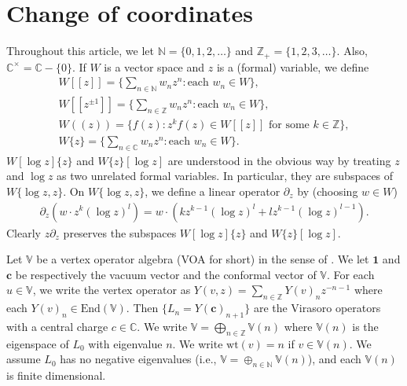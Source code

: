 \documentclass[12pt,a4paper,notitlepage]{article}
\theoremstyle{definition}
\theoremstyle{plain}
\newcommand{\End}{\mathrm{End}} %
\newcommand{\id}{\mathbf{1}}
\newcommand{\mbb}{\mathbb}
\newcommand{\Vbb}{\mathbb V}
\newcommand{\Cbb}{\mathbb C}
\newcommand{\Nbb}{\mathbb N}
\newcommand{\Zbb}{\mathbb Z}
\newcommand{\cbf}{\mathbf c}
\newcommand{\wt}{\mathrm{wt}}
\numberwithin{equation}{section}
\begin{document}
\section{Change of coordinates}\label{lb58}

Throughout this article, we let $\Nbb=\{0,1,2,\dots\}$ and $\Zbb_+=\{1,2,3,\dots\}$. Also, $\Cbb^\times=\Cbb-\{0\}$. If $W$ is a vector space and $z$ is a (formal) variable, we  define 
\begin{gather*}
W[[z]]=\bigg\{\sum_{n\in\mathbb N}w_nz^n:\text{each }w_n\in W\bigg\},\\
W[[z^{\pm 1}]]=\bigg\{\sum_{n\in\mathbb Z}w_nz^n:\text{each }w_n\in W\bigg\},\\
W((z))=\Big\{f(z):z^kf(z)\in W[[z]]\text{ for some }k\in\mbb Z \Big\},\\
W\{z\}=\Big\{\sum_{n\in\mbb C}w_nz^n :\text{each $w_n\in W$}\Big\}.
\end{gather*}
$W[\log z]\{z\}$ and $W\{z\}[\log z]$ are understood in the obvious way by treating  $z$ and $\log z$ as two unrelated formal variables. In particular, they are subspaces of $W\{\log z,z\}$. On   $W\{\log z,z\}$, we define a linear operator $\partial_z$ by (choosing $w\in W$)
\begin{align}
\partial_z(w\cdot z^k(\log z)^l)=w\cdot(kz^{k-1}(\log z)^l+lz^{k-1}(\log z)^{l-1}). \label{eq101}	
\end{align}
Clearly $z\partial_z$ preserves the subspaces $W[\log z]\{z\}$ and $W\{z\}[\log z]$.

Let $\Vbb$ be a vertex operator algebra (VOA for short) in the sense of \cite{FHL93}. We let $\id$ \index{1@$\id$} and $\cbf$ \index{c@$\cbf$} be respectively the vacuum vector and the conformal vector of $\Vbb$. For each $u\in\Vbb$, we write the vertex operator as $Y(v,z)=\sum_{n\in\Zbb}Y(v)_nz^{-n-1}$ where each $Y(v)_n\in\End(\Vbb)$. Then $\{L_n=Y(\cbf)_{n+1} \}$ are the Virasoro operators with a central charge  $c\in\Cbb$. We write $\Vbb=\bigoplus_{n\in\Zbb}\Vbb(n)$ where $\Vbb(n)$ is the eigenspace of $L_0$ with eigenvalue $n$. We write $\wt(v)=n$ if $v\in\Vbb(n)$. We assume $L_0$ has no negative eigenvalues (i.e., $\Vbb=\oplus_{n\in\Nbb}\Vbb(n)$), and each $\Vbb(n)$ is finite dimensional.
\end{document}
